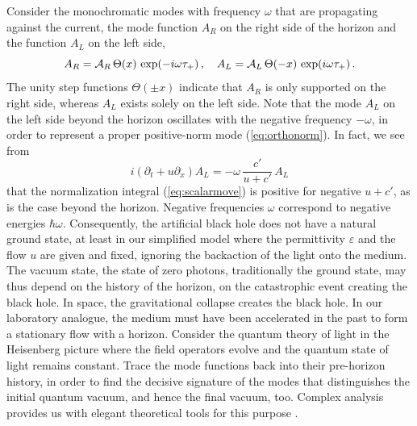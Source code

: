 \documentclass[12pt,amsmath,amssymb]{article}
\numberwithin{equation}{section}
\begin{document}
Consider the monochromatic modes with frequency $\omega$
that are propagating against the current, the mode function
$A_R$ on the right side of the horizon and
the function $A_L$ on the left side,
\begin{equation}
\label{eq:alar}
A_R = {\cal A}_R\, \Theta(x)\,\exp(-i\omega\tau_+) \,,\quad
A_L = {\cal A}_L\, \Theta(-x)\,\exp(i\omega\tau_+) \,.
\end{equation}
The unity step functions $\Theta(\pm x)$ indicate that
$A_R$ is only supported on the right side, whereas
$A_L$ exists solely on the left side.
Note that the mode $A_L$ on the left side beyond the horizon
oscillates with the negative frequency $-\omega$,
in order to represent a proper positive-norm mode
(\ref{eq:orthonorm}). In fact, we see from
\begin{equation}
i(\partial_t + u\partial_x) A_L =
-\omega\,\frac{c'}{u+c'}\, A_L
\end{equation}
that the normalization integral (\ref{eq:scalarmove})
is positive for negative $u+c'$, as is the case beyond the horizon.
Negative frequencies $\omega$ correspond to negative energies
$\hbar\omega$. Consequently, the artificial black hole
does not have a natural ground state, at least in our simplified
model where the permittivity $\varepsilon$ and the flow $u$
are given and fixed, ignoring the backaction of the light
onto the medium.
The vacuum state, the state of zero photons,
traditionally the ground state, may thus depend on the history
of the horizon, on the catastrophic event creating the black hole.
In space, the gravitational collapse creates
the black hole. In our laboratory analogue, the medium
must have been accelerated in the past to form a stationary flow
with a horizon. Consider the quantum theory of light in the
Heisenberg picture where the field operators evolve and the
quantum state of light remains constant.
Trace the mode functions back into their pre-horizon history,
in order to find the decisive signature of the modes
that distinguishes the initial quantum vacuum, and hence
the final vacuum, too.
Complex analysis provides us with
elegant theoretical tools for this purpose
\cite{Brout,DamourRuffini}.
\end{document}
